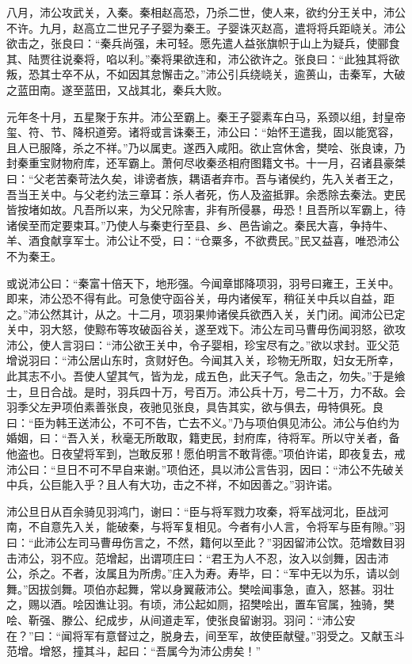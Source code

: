 \documentclass[12pt,UTF8]{ctexbook}
\begin{document}
八月，沛公攻武关，入秦。秦相赵高恐，乃杀二世，使人来，欲约分王关中，沛公不许。九月，赵高立二世兄子子婴为秦王。子婴诛灭赵高，遣将将兵距峣关。沛公欲击之，张良曰：“秦兵尚强，未可轻。愿先遣人益张旗帜于山上为疑兵，使郦食其、陆贾往说秦将，啗以利。”秦将果欲连和，沛公欲许之。张良曰：“此独其将欲叛，恐其士卒不从，不如因其怠懈击之。”沛公引兵绕峣关，逾蒉山，击秦军，大破之蓝田南。遂至蓝田，又战其北，秦兵大败。



元年冬十月，五星聚于东井。沛公至霸上。秦王子婴素车白马，系颈以组，封皇帝玺、符、节、降枳道旁。诸将或言诛秦王，沛公曰：“始怀王遣我，固以能宽容，且人已服降，杀之不祥。”乃以属吏。遂西入咸阳。欲止宫休舍，樊哙、张良谏，乃封秦重宝财物府库，还军霸上。萧何尽收秦丞相府图籍文书。十一月，召诸县豪桀曰：“父老苦秦苛法久矣，诽谤者族，耦语者弃市。吾与诸侯约，先入关者王之，吾当王关中。与父老约法三章耳：杀人者死，伤人及盗抵罪。余悉除去秦法。吏民皆按堵如故。凡吾所以来，为父兄除害，非有所侵暴，毋恐！且吾所以军霸上，待诸侯至而定要束耳。”乃使人与秦吏行至县、乡、邑告谕之。秦民大喜，争持牛、羊、酒食献享军士。沛公让不受，曰：“仓粟多，不欲费民。”民又益喜，唯恐沛公不为秦王。



或说沛公曰：“秦富十倍天下，地形强。今闻章邯降项羽，羽号曰雍王，王关中。即来，沛公恐不得有此。可急使守函谷关，毋内诸侯军，稍征关中兵以自益，距之。”沛公然其计，从之。十二月，项羽果帅诸侯兵欲西入关，关门闭。闻沛公已定关中，羽大怒，使黥布等攻破函谷关，遂至戏下。沛公左司马曹毋伤闻羽怒，欲攻沛公，使人言羽曰：“沛公欲王关中，令子婴相，珍宝尽有之。”欲以求封。亚父范增说羽曰：“沛公居山东时，贪财好色。今闻其入关，珍物无所取，妇女无所幸，此其志不小。吾使人望其气，皆为龙，成五色，此天子气。急击之，勿失。”于是飨士，旦日合战。是时，羽兵四十万，号百万。沛公兵十万，号二十万，力不敌。会羽季父左尹项伯素善张良，夜驰见张良，具告其实，欲与俱去，毋特俱死。良曰：“臣为韩王送沛公，不可不告，亡去不义。”乃与项伯俱见沛公。沛公与伯约为婚姻，曰：“吾入关，秋毫无所敢取，籍吏民，封府库，待将军。所以守关者，备他盗也。日夜望将军到，岂敢反邪！愿伯明言不敢背德。”项伯许诺，即夜复去，戒沛公曰：“旦日不可不早自来谢。”项伯还，具以沛公言告羽，因曰：“沛公不先破关中兵，公巨能入乎？且人有大功，击之不祥，不如因善之。”羽许诺。



沛公旦日从百余骑见羽鸿门，谢曰：“臣与将军戮力攻秦，将军战河北，臣战河南，不自意先入关，能破秦，与将军复相见。今者有小人言，令将军与臣有隙。”羽曰：“此沛公左司马曹毋伤言之，不然，籍何以至此？”羽因留沛公饮。范增数目羽击沛公，羽不应。范增起，出谓项庄曰：“君王为人不忍，汝入以剑舞，因击沛公，杀之。不者，汝属且为所虏。”庄入为寿。寿毕，曰：“军中无以为乐，请以剑舞。”因拔剑舞。项伯亦起舞，常以身翼蔽沛公。樊哙闻事急，直入，怒甚。羽壮之，赐以酒。哙因谯让羽。有顷，沛公起如厕，招樊哙出，置车官属，独骑，樊哙、靳强、滕公、纪成步，从间道走军，使张良留谢羽。羽问：“沛公安在？”曰：“闻将军有意督过之，脱身去，间至军，故使臣献璧。”羽受之。又献玉斗范增。增怒，撞其斗，起曰：“吾属今为沛公虏矣！”
\end{document}
